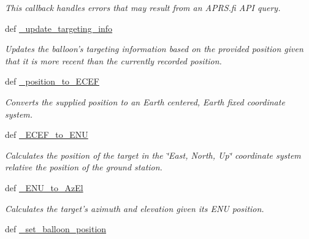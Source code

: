 \begin{DoxyCompactItemize}
\begin{DoxyCompactList}\small\item\em This callback handles errors that may result from an A\-P\-R\-S.\-fi A\-P\-I query. \end{DoxyCompactList}\item 
def \hyperlink{classhwm_1_1hardware_1_1devices_1_1drivers_1_1mxl__balloon__tracker_1_1mxl__balloon__tracker_1_1e3a9bc8b0b4bc235d39c93a5b84975bc_ad20cb6e806fa229a5f88cad3a5802fb8}{\-\_\-update\-\_\-targeting\-\_\-info}
\begin{DoxyCompactList}\small\item\em Updates the balloon's targeting information based on the provided position given that it is more recent than the currently recorded position. \end{DoxyCompactList}\item 
def \hyperlink{classhwm_1_1hardware_1_1devices_1_1drivers_1_1mxl__balloon__tracker_1_1mxl__balloon__tracker_1_1e3a9bc8b0b4bc235d39c93a5b84975bc_af7f3d199ccdeeb51a8e878eba2583453}{\-\_\-position\-\_\-to\-\_\-\-E\-C\-E\-F}
\begin{DoxyCompactList}\small\item\em Converts the supplied position to an Earth centered, Earth fixed coordinate system. \end{DoxyCompactList}\item 
def \hyperlink{classhwm_1_1hardware_1_1devices_1_1drivers_1_1mxl__balloon__tracker_1_1mxl__balloon__tracker_1_1e3a9bc8b0b4bc235d39c93a5b84975bc_ae3eceb214a5855cbed2ca2d35eaad85e}{\-\_\-\-E\-C\-E\-F\-\_\-to\-\_\-\-E\-N\-U}
\begin{DoxyCompactList}\small\item\em Calculates the position of the target in the \char`\"{}\-East, North, Up\char`\"{} coordinate system relative the position of the ground station. \end{DoxyCompactList}\item 
def \hyperlink{classhwm_1_1hardware_1_1devices_1_1drivers_1_1mxl__balloon__tracker_1_1mxl__balloon__tracker_1_1e3a9bc8b0b4bc235d39c93a5b84975bc_ab153ff263c04fee9e14ceb4e4fb85567}{\-\_\-\-E\-N\-U\-\_\-to\-\_\-\-Az\-El}
\begin{DoxyCompactList}\small\item\em Calculates the target's azimuth and elevation given its E\-N\-U position. \end{DoxyCompactList}\item 
def \hyperlink{classhwm_1_1hardware_1_1devices_1_1drivers_1_1mxl__balloon__tracker_1_1mxl__balloon__tracker_1_1e3a9bc8b0b4bc235d39c93a5b84975bc_a605f3a9e84cd47999795610741e45cce}{\-\_\-set\-\_\-balloon\-\_\-position}

\end{DoxyCompactItemize}
